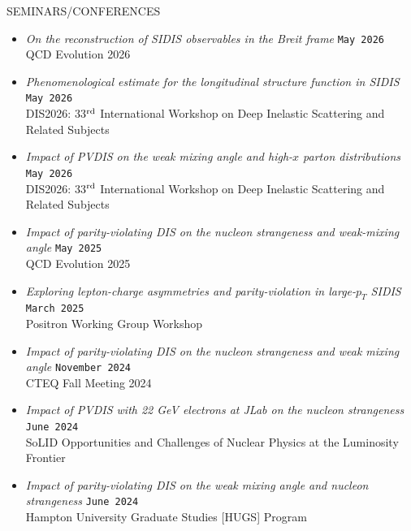 \documentclass[10pt,a4paper]{article}
\newcommand\datei[1]{\texttt{#1}}
\newenvironment{cvsection}[1]
{
{\LARGE #1} \hrulefill
\vspace*{3ex}
}
{
\vspace*{3ex}
}
\begin{document}

\begin{cvsection}{SEMINARS/CONFERENCES}

\begin{itemize}[leftmargin=*,label=$\circ$]

\item \textit{On the reconstruction of SIDIS
observables in the Breit frame} \hfill \datei{May 2026} \\
QCD Evolution 2026

\item \textit{Phenomenological estimate for the
longitudinal structure function in SIDIS} \hfill \datei{May 2026} \\
DIS2026: 33$^{\rm rd}$ International Workshop on Deep Inelastic Scattering and Related Subjects

\item \textit{Impact of PVDIS on the weak mixing
angle and high-$x$ parton distributions} \hfill \datei{May 2026} \\
DIS2026: 33$^{\rm rd}$ International Workshop on Deep Inelastic Scattering and Related Subjects

\item \textit{Impact of parity-violating DIS on the nucleon
strangeness and weak-mixing angle} \hfill \datei{May 2025} \\
QCD Evolution 2025

\item \textit{Exploring lepton-charge asymmetries and
parity-violation in large-$p_T$ SIDIS} \hfill \datei{March 2025} \\
Positron Working Group Workshop

\item \textit{Impact of parity-violating DIS on the nucleon strangeness and weak mixing angle} \hfill \datei{November 2024} \\
CTEQ Fall Meeting 2024

\item \textit{Impact of PVDIS with 22 GeV electrons at JLab
on the nucleon strangeness} \hfill \datei{June 2024} \\
SoLID Opportunities and Challenges of Nuclear Physics at the Luminosity Frontier

\item \textit{Impact of parity-violating DIS on the weak mixing angle and nucleon strangeness} \hfill \datei{June 2024} \\
Hampton University Graduate Studies [HUGS] Program


\end{itemize}
\end{cvsection}
\end{document}
